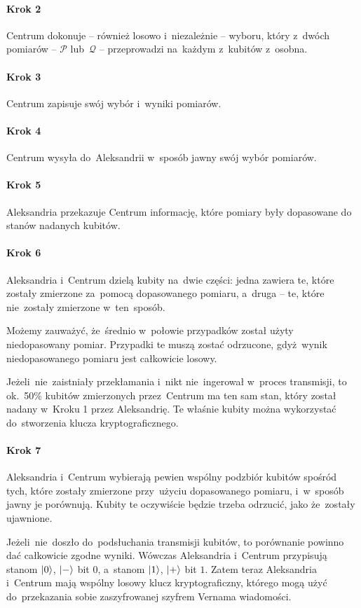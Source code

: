 \paragraph{Krok 2} Centrum dokonuje -- również losowo i~niezależnie --
wyboru, który z~dwóch pomiarów -- $\mathcal{P}$ lub~$\mathcal{Q}$ -- przeprowadzi na~każdym z~kubitów z~osobna.
\paragraph{Krok 3} Centrum zapisuje swój wybór i~wyniki pomiarów.
\paragraph{Krok 4} Centrum wysyła do~Aleksandrii w~sposób jawny swój wybór pomiarów.
\paragraph{Krok 5} Aleksandria przekazuje Centrum informację, które pomiary były dopasowane do stanów
nadanych kubitów.
\paragraph{Krok 6} Aleksandria i~Centrum dzielą kubity na~dwie części: jedna zawiera te, które
zostały zmierzone za~pomocą dopasowanego pomiaru, a~druga -- te, które nie~zostały zmierzone w~ten~sposób.

Możemy zauważyć, że~średnio w~połowie przypadków został użyty
niedopasowany pomiar. Przypadki te muszą zostać odrzucone, gdyż~wynik
niedopasowanego pomiaru jest całkowicie losowy.

Jeżeli~nie~zaistniały przekłamania i~nikt nie~ingerował w~proces
transmisji, to ok.~50\% kubitów zmierzonych przez~Centrum ma ten sam  stan, który został nadany w~Kroku 1 przez Aleksandrię. Te właśnie kubity można wykorzystać do~stworzenia klucza kryptograficznego.

\paragraph{Krok 7} Aleksandria i~Centrum wybierają pewien wspólny
podzbiór kubitów spośród tych, które zostały zmierzone przy~użyciu
dopasowanego pomiaru, i~w~sposób jawny je porównują. Kubity te oczywiście
będzie trzeba odrzucić, jako że~zostały ujawnione.

Jeżeli~nie~doszło do~podsłuchania transmisji kubitów, to porównanie
powinno dać całkowicie zgodne wyniki. Wówczas Aleksandria i~Centrum
przypisują stanom $\ket{0}$, $\ket{-}$ bit $0$, a~stanom $\ket{1}$,
$\ket{+}$ bit $1$. Zatem teraz Aleksandria i~Centrum mają wspólny
losowy klucz kryptograficzny, którego mogą użyć do~przekazania sobie
zaszyfrowanej szyfrem Vernama wiadomości.

